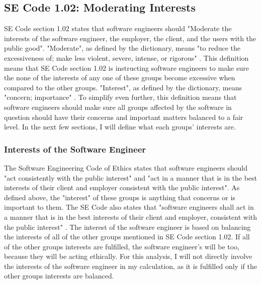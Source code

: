 \documentclass[11pt]{article}
\begin{document}
\begin{multicols}{2}
\subsection{SE Code 1.02: Moderating Interests}
SE Code section 1.02 states that software engineers should "Moderate the interests of the software engineer, the employer, the client, and the users with the public good"\cite{secode}. "Moderate", as defined by the dictionary, means "to reduce the excessiveness of; make less violent, severe, intense, or rigorous" \cite{dictionary}. This definition means that SE Code section 1.02 is instructing software engineers to make sure the none of the interests of any one of these groups become excessive when compared to the other groups. "Interest", as defined by the dictionary, means "concern; importance" \cite{dictionary}. To simplify even further, this definition means that software engineers should make sure all groups affected by the software in question should have their concerns and important matters balanced to a fair level. In the next few sections, I will define what each groups' interests are.
\subsubsection{Interests of the Software Engineer}
The Software Engineering Code of Ethics states that software engineers should "act consistently with the public interest" and "act in a manner that is in the best interests of their client and employer consistent with the public interest"\cite{secode}. As defined above, the "interest" of these groups is anything that concerns or is important to them. The SE Code also states that "software engineers shall act in a manner that is in the best interests of their client and employer, consistent with the public interest" \cite{secode}. The interest of the software engineer is based on balancing the interests of all of the other groups mentioned in SE Code section 1.02. If all of the other groups interests are fulfilled, the software engineer's will be too, because they will be acting ethically. For this analysis, I will not directly involve the interests of the software engineer in my calculation, as it is fulfilled only if the other groups interests are balanced.

\end{multicols}
\end{document}
